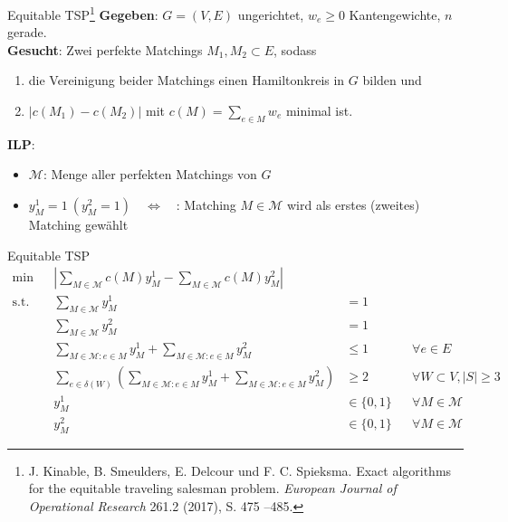\documentclass[ngerman,aspectratio=169,10pt]{beamer}
\begin{document}
\begin{frame}{Equitable TSP\footnote{J. Kinable, B. Smeulders, E. Delcour und F. C. Spieksma. Exact algorithms for the equitable traveling salesman problem. \emph{European Journal of Operational Research} 261.2 (2017), S. 475 –485.}}
	\textbf{Gegeben}: $G=(V,E)$ ungerichtet, $w_e\geq0$ Kantengewichte, $n$ gerade.\\
	\textbf{Gesucht}: Zwei perfekte Matchings $M_1,M_2\subset E$, sodass
	\begin{enumerate}
		\item die Vereinigung beider Matchings einen Hamiltonkreis in $G$ bilden und
		\item $|c(M_1)-c(M_2)|$ mit $c(M)=\sum_{e\in M}w_e$ minimal ist.
	\end{enumerate}
	
	\textbf{ILP}:
	\begin{itemize}
		\item $\mathcal{M}$: Menge aller perfekten Matchings von $G$
		\item $y_M^1=1~(y_M^2=1)\quad\Leftrightarrow\quad$: Matching $M\in\mathcal{M}$ wird als erstes (zweites) Matching gewählt
	\end{itemize}
\end{frame}
\begin{frame}{Equitable TSP}
	\begin{align*}
	\min    && \left|\sum_{M\in\mathcal{M}}c(M)y_M^1-\sum_{M\in\mathcal{M}}c(M)y_M^2\right|\\
	\text{s.t.} && \sum_{M\in\mathcal{M}}y_M^1 &=1&&\\
	&& \sum_{M\in\mathcal{M}}y_M^2 &=1&&\\
	&& \sum_{M\in\mathcal{M}:e\in M}y_M^1+\sum_{M\in\mathcal{M}:e\in M}y_M^2 &\leq1 &&\forall e\in E\\
	&& \sum_{e\in\delta(W)}\left(\sum_{M\in\mathcal{M}:e\in M}y_M^1+\sum_{M\in\mathcal{M}:e\in M}y_M^2\right) &\geq 2 &&\forall W\subset V, |S| \geq 3\\
	&& y_M^1 &\in\{0,1\} &&\forall M\in\mathcal{M}\\
	&& y_M^2 &\in\{0,1\} &&\forall M\in\mathcal{M}
	\end{align*}
\end{frame}
\end{document}
